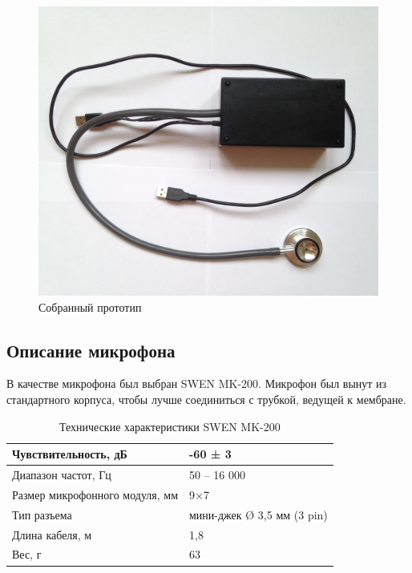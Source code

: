 \documentclass[../paper.tex]{subfiles}
\begin{document}
\begin{figure}[H]
\centering
\includegraphics[width=15cm]{images/hardware.jpg}
\caption{Собранный прототип}
\end{figure}

\subsection{Описание микрофона}
В качестве микрофона был выбран SWEN MK-200. Микрофон был вынут из стандартного корпуса, чтобы лучше соединиться с трубкой, ведущей к мембране. \\

\begin{table}[h]
\centering
\caption{Технические характеристики SWEN MK-200}
\begin{tabular}{|l|l|}
\hline
Чувствительность, дБ           & -60 ± 3                    \\ \hline
Диапазон частот, Гц            & 50 – 16 000                \\ \hline
Размер микрофонного модуля, мм & 9×7                        \\ \hline
Тип разъема                    & мини-джек Ø 3,5 мм (3 pin) \\ \hline
Длина кабеля, м                & 1,8                        \\ \hline
Вес, г                         & 63                         \\ \hline
\end{tabular}
\end{table}
\end{document}
